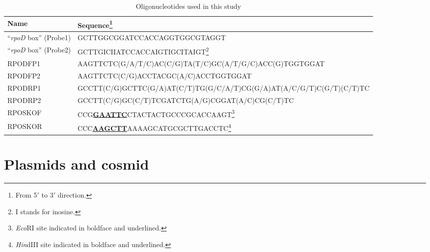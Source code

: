 \begin{table}[tbp]
\linespread{1}\normalsize
\renewcommand{\arraystretch}{1.5}
\begin{minipage}[c]{\textwidth}
\renewcommand{\footnoterule}{}
\caption{Oligonucleotides used in this study} \label{chap2_oligos}
\begin{narrow}{-1in}{-1in}
\centering
\begin{small}
\begin{tabular}{@{}lp{4.5in}@{}}\toprule
\textbf{Name} & \textbf{Sequence\protect\footnote{From 5$'$ to
3$'$ direction.}}\\\midrule ``\emph{rpoD} box'' (Probe1) &
GCTTGGCGGATCCACCAGGTGGCGTAGGT\\
``\emph{rpoD} box'' (Probe2) &
GCTTGICIIATCCACCAIGTIGCITAIGT\protect\footnote{I stands for inosine.}\\
RPODFP1 &
AAGTTCTC(G/A/T/C)AC(C/G)TA(T/C)GC(A/T/G/C)ACC(G)T\-G\-G\-T\-G\-G\-A\-T\\
RPODFP2 & AAGTTCTC(C/G)ACCTACGC(A/C)ACCTGGTGGAT \\
RPODRP1 &
GCCTT(C/G)GCTTC(G/A)AT(C/T)TG(G/C/A/T)CG(G/A)\-AT\-(A/C/G/T)\-C\-(G/T)(C/T)TC\\
RPODRP2 &
GCCTT(C/G)GC(C/T)TCGATCTG(A/G)CGGAT(A/C)CG(C/T)TC\\
RPOSKOF &
CCG\textbf{\underline{GAATTC}}CTACTACTGCCCGCACCAAGT\protect\footnote{\emph{Eco}RI
site indicated in boldface and underlined.} \\
RPOSKOR &
CCC\textbf{\underline{AAGCTT}}AAAAGCATGCGCTTGACCTC\protect\footnote{\emph{Hin}dIII
site indicated in boldface and underlined.}\\
\bottomrule
\end{tabular}
\end{small}
\end{narrow}
\end{minipage}
\linespread{1.1}\normalsize
\renewcommand{\arraystretch}{1.0}
\end{table}
\section{Plasmids and cosmid}

